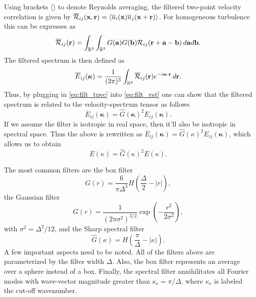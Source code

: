 \documentclass[oneside,a4paper,11pt]{report}
\newcommand{\tpvc}{\mathcal{R}} %
\newcommand{\est}{E}            %
\newcommand{\kappavec}{\boldsymbol{\kappa}}
\newcommand{\ures}{\overline{u}}
\begin{document}
Using brackets $\langle \rangle$ to denote Reynolds averaging, the filtered two-point velocity correlation is given by $\overline{\tpvc}_{ij}(\xvec, \rvec) = \langle \ures_i(\xvec) \ures_j(\xvec + \rvec) \rangle$. For homogeneous turbulence this can be expresses as
\begin{equation}
\label{eq:filt_tpvc}
\overline{\tpvc}_{ij}(\rvec) = \int_\Rthree \int_\Rthree G(\avec) G(\bvec) \tpvc_{ij}(\rvec + \avec - \bvec) \, d\avec d\bvec.
\end{equation}
The filtered spectrum is then defined as
\begin{equation}
\label{eq:filt_vst}
\overline{\est}_{ij}(\kappavec) = \frac{1}{ (2\pi)^3 } \int_\Rthree \overline{\tpvc}_{ij} (\rvec) e^{-i \kappavec \cdot \rvec} \, d\rvec.
\end{equation}
Thus, by plugging in \cref{eq:filt_tpvc} into \cref{eq:filt_vst} one can show that the filtered spectrum is related to the velocity-spectrum tensor as follows
\begin{equation}
\overline{\est}_{ij} (\kappavec) = \hat{G}(\kappavec)^2 \est_{ij}(\kappavec).
\end{equation}
If we assume the filter is isotropic in real space, then it'll also be isotropic in spectral space. Thus the above is rewritten as $\overline{\est}_{ij} (\kappavec) = \hat{G}( \kappa )^2 \est_{ij}(\kappavec)$, which allows us to obtain
\begin{equation}
\overline{\est}(\kappa) = \hat{G}(\kappa)^2 \est(\kappa).
\end{equation}

The most common filters are the box filter 
\begin{equation}
G( r ) = \frac{6 }{\pi  \Delta^3} H ( \frac{\Delta}{2} - | r | ),
\end{equation}
the Gaussian filter
\begin{equation}
G( r ) = \frac{ 1 }{ ( 2 \pi \sigma^2 )^{3/2} } \exp \left( -\frac{ r^2 }{ 2 \sigma^2  } \right ),
\end{equation}
with $\sigma^2 = \Delta^2/12$, and the Sharp spectral filter
\begin{equation}
\hat{G}( \kappa ) = H( \frac{ \pi }{ \Delta } - | \kappa | ).
\end{equation}
A few important aspects need to be noted. All of the filters above are parameterized by the filter width $\Delta$. Also, the box filter represents an average over a sphere instead of a box. Finally, the spectral filter annihilitates all Fourier modes with wave-vector magnitude greater than $\kappa_c = \pi / \Delta$, where $\kappa_c$ is labeled the cut-off wavenumber.
\end{document}
